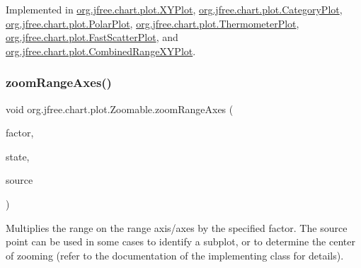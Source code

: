 Implemented in \mbox{\hyperlink{classorg_1_1jfree_1_1chart_1_1plot_1_1_x_y_plot_a33fd9493f13695916d80e67997446cdd}{org.\+jfree.\+chart.\+plot.\+X\+Y\+Plot}}, \mbox{\hyperlink{classorg_1_1jfree_1_1chart_1_1plot_1_1_category_plot_a5d06327bbfefc37d4178546762057477}{org.\+jfree.\+chart.\+plot.\+Category\+Plot}}, \mbox{\hyperlink{classorg_1_1jfree_1_1chart_1_1plot_1_1_polar_plot_ad96a8912dd48c5e3b0bb22351c4427ad}{org.\+jfree.\+chart.\+plot.\+Polar\+Plot}}, \mbox{\hyperlink{classorg_1_1jfree_1_1chart_1_1plot_1_1_thermometer_plot_a3cbbcfa1a2488b10bd600f1757d41fec}{org.\+jfree.\+chart.\+plot.\+Thermometer\+Plot}}, \mbox{\hyperlink{classorg_1_1jfree_1_1chart_1_1plot_1_1_fast_scatter_plot_a0f98b8231152c36b8c4f1b6df06df922}{org.\+jfree.\+chart.\+plot.\+Fast\+Scatter\+Plot}}, and \mbox{\hyperlink{classorg_1_1jfree_1_1chart_1_1plot_1_1_combined_range_x_y_plot_ab76144ac2ca476eaa44eeee4d662b3e6}{org.\+jfree.\+chart.\+plot.\+Combined\+Range\+X\+Y\+Plot}}.

\mbox{\label{interfaceorg_1_1jfree_1_1chart_1_1plot_1_1_zoomable_a906118396b0cc076e43cc7c072a3842c}} 
\subsubsection{\texorpdfstring{zoom\+Range\+Axes()}{zoomRangeAxes()}\hspace{0.1cm}{\footnotesize\ttfamily [1/3]}}
{\footnotesize\ttfamily void org.\+jfree.\+chart.\+plot.\+Zoomable.\+zoom\+Range\+Axes (\begin{DoxyParamCaption}\item[{double}]{factor,  }\item[{\mbox{\hyperlink{classorg_1_1jfree_1_1chart_1_1plot_1_1_plot_rendering_info}{Plot\+Rendering\+Info}}}]{state,  }\item[{Point2D}]{source }\end{DoxyParamCaption})}

Multiplies the range on the range axis/axes by the specified factor. The {\ttfamily source} point can be used in some cases to identify a subplot, or to determine the center of zooming (refer to the documentation of the implementing class for details).


